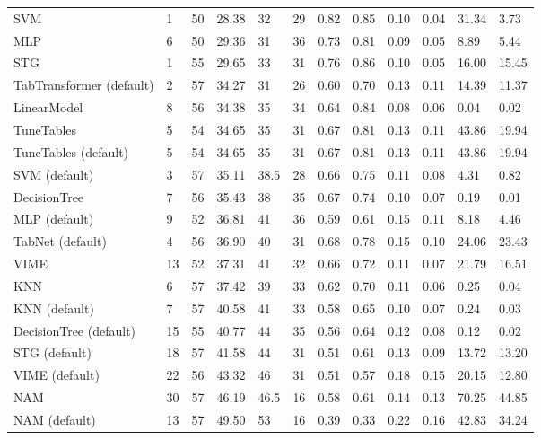 \begin{tabular}{lllllrllllll}
SVM & 1 & 50 & 28.38 & 32 & 29 & 0.82 & 0.85 & 0.10 & 0.04 & 31.34 & 3.73 \\
MLP & 6 & 50 & 29.36 & 31 & 36 & 0.73 & 0.81 & 0.09 & 0.05 & 8.89 & 5.44 \\
STG & 1 & 55 & 29.65 & 33 & 31 & 0.76 & 0.86 & 0.10 & 0.05 & 16.00 & 15.45 \\
TabTransformer (default) & 2 & 57 & 34.27 & 31 & 26 & 0.60 & 0.70 & 0.13 & 0.11 & 14.39 & 11.37 \\
LinearModel & 8 & 56 & 34.38 & 35 & 34 & 0.64 & 0.84 & 0.08 & 0.06 & 0.04 & 0.02 \\
TuneTables & 5 & 54 & 34.65 & 35 & 31 & 0.67 & 0.81 & 0.13 & 0.11 & 43.86 & 19.94 \\
TuneTables (default) & 5 & 54 & 34.65 & 35 & 31 & 0.67 & 0.81 & 0.13 & 0.11 & 43.86 & 19.94 \\
SVM (default) & 3 & 57 & 35.11 & 38.5 & 28 & 0.66 & 0.75 & 0.11 & 0.08 & 4.31 & 0.82 \\
DecisionTree & 7 & 56 & 35.43 & 38 & 35 & 0.67 & 0.74 & 0.10 & 0.07 & 0.19 & 0.01 \\
MLP (default) & 9 & 52 & 36.81 & 41 & 36 & 0.59 & 0.61 & 0.15 & 0.11 & 8.18 & 4.46 \\
TabNet (default) & 4 & 56 & 36.90 & 40 & 31 & 0.68 & 0.78 & 0.15 & 0.10 & 24.06 & 23.43 \\
VIME & 13 & 52 & 37.31 & 41 & 32 & 0.66 & 0.72 & 0.11 & 0.07 & 21.79 & 16.51 \\
KNN & 6 & 57 & 37.42 & 39 & 33 & 0.62 & 0.70 & 0.11 & 0.06 & 0.25 & 0.04 \\
KNN (default) & 7 & 57 & 40.58 & 41 & 33 & 0.58 & 0.65 & 0.10 & 0.07 & 0.24 & 0.03 \\
DecisionTree (default) & 15 & 55 & 40.77 & 44 & 35 & 0.56 & 0.64 & 0.12 & 0.08 & 0.12 & 0.02 \\
STG (default) & 18 & 57 & 41.58 & 44 & 31 & 0.51 & 0.61 & 0.13 & 0.09 & 13.72 & 13.20 \\
VIME (default) & 22 & 56 & 43.32 & 46 & 31 & 0.51 & 0.57 & 0.18 & 0.15 & 20.15 & 12.80 \\
NAM & 30 & 57 & 46.19 & 46.5 & 16 & 0.58 & 0.61 & 0.14 & 0.13 & 70.25 & 44.85 \\
NAM (default) & 13 & 57 & 49.50 & 53 & 16 & 0.39 & 0.33 & 0.22 & 0.16 & 42.83 & 34.24 \\
\bottomrule
\end{tabular}
